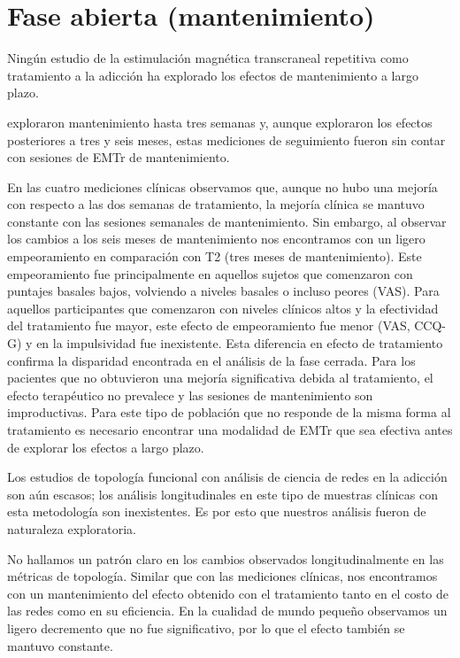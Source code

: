 \section{Fase abierta (mantenimiento)}
Ningún estudio de la estimulación magnética transcraneal repetitiva como tratamiento a la adicción ha explorado los efectos de mantenimiento a largo plazo.\par
\textcite{Terraneo2016} exploraron mantenimiento hasta tres semanas y, aunque \textcite{Bolloni2016} exploraron los efectos posteriores a tres y seis meses, estas mediciones de seguimiento  fueron sin contar con sesiones de EMTr de mantenimiento.\par
En las cuatro mediciones clínicas observamos que, aunque no hubo una mejoría con respecto a las dos semanas de tratamiento, la mejoría clínica se mantuvo constante con las sesiones semanales de mantenimiento.
Sin embargo, al observar los cambios a los seis meses de mantenimiento nos encontramos con un ligero empeoramiento en comparación con T2 (tres meses de mantenimiento). Este empeoramiento fue principalmente en aquellos sujetos que comenzaron con puntajes basales bajos, volviendo a niveles basales o incluso peores (VAS). Para aquellos participantes que comenzaron con niveles clínicos altos y la efectividad del tratamiento fue mayor, este efecto de empeoramiento fue menor (VAS, CCQ-G) y en la impulsividad fue inexistente.
Esta diferencia en efecto de tratamiento confirma la disparidad encontrada en el análisis de la fase cerrada. Para los pacientes que no obtuvieron una mejoría significativa debida al tratamiento, el efecto terapéutico no prevalece y las sesiones de mantenimiento son improductivas. Para este tipo de población que no responde de la misma forma al tratamiento es necesario encontrar una modalidad de EMTr que sea efectiva antes de explorar los efectos a largo plazo.\par
Los estudios de topología funcional con análisis de ciencia de redes en la adicción son aún escasos; los análisis longitudinales en este tipo de muestras clínicas con esta metodología son inexistentes. Es por esto que nuestros análisis fueron de naturaleza exploratoria.\par
No hallamos un patrón claro en los cambios observados longitudinalmente en las métricas de topología. Similar que con las mediciones clínicas, nos encontramos con un mantenimiento del efecto obtenido con el tratamiento tanto en el costo de las redes como en su eficiencia. En la cualidad de mundo pequeño observamos un ligero decremento que no fue significativo, por lo que el efecto también se mantuvo constante. \par
